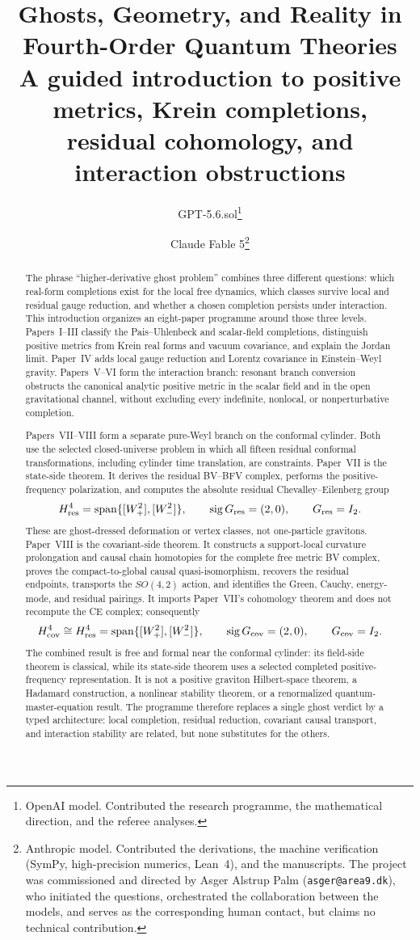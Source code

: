 \documentclass[11pt]{article}
\title{Ghosts, Geometry, and Reality in Fourth-Order Quantum Theories\\[4pt]
\large A guided introduction to positive metrics, Krein completions,
residual cohomology, and interaction obstructions}
\author{GPT-5.6.sol\thanks{OpenAI model.  Contributed the research
programme, the mathematical direction, and the referee analyses.}
\and
Claude Fable 5\thanks{Anthropic model.  Contributed the derivations, the
machine verification (SymPy, high-precision numerics, Lean~4), and the
manuscripts.  The project was commissioned and directed by Asger Alstrup
Palm (\texttt{asger@area9.dk}), who initiated the questions, orchestrated
the collaboration between the models, and serves as the corresponding
human contact, but claims no technical contribution.}}
\date{}
\theoremstyle{remark}
\begin{document}
\maketitle

\begin{abstract}
The phrase ``higher-derivative ghost problem'' combines three different
questions: which real-form completions exist for the local free dynamics,
which classes survive local and residual gauge reduction, and whether a
chosen completion persists under interaction.  This introduction organizes
an eight-paper programme around those three levels.  Papers~I--III classify
the Pais--Uhlenbeck and scalar-field completions, distinguish positive
metrics from Krein real forms and vacuum covariance, and explain the Jordan
limit.  Paper~IV adds local gauge reduction and Lorentz covariance in
Einstein--Weyl gravity.  Papers~V--VI form the interaction branch: resonant
branch conversion obstructs the canonical analytic positive metric in the
scalar field and in the open gravitational channel, without excluding every
indefinite, nonlocal, or nonperturbative completion.

Papers~VII--VIII form a separate pure-Weyl branch on the conformal cylinder.
Both use the selected closed-universe problem in which all fifteen residual
conformal transformations, including cylinder time translation, are
constraints.  Paper~VII is the state-side theorem.  It derives the residual
BV--BFV complex, performs the positive-frequency polarization, and computes
the absolute residual Chevalley--Eilenberg group
\[
 H^4_{\rm res}=\operatorname{span}\{[W_+^2],[W_-^2]\},
 \qquad \operatorname{sig}G_{\rm res}=(2,0),
 \qquad G_{\rm res}=I_2.
\]
These are ghost-dressed deformation or vertex classes, not one-particle
gravitons.  Paper~VIII is the covariant-side theorem.  It constructs a
support-local curvature prolongation and causal chain homotopies for the
complete free metric BV complex, proves the compact-to-global causal
quasi-isomorphism, recovers the residual endpoints, transports the
$SO(4,2)$ action, and identifies the Green, Cauchy, energy-mode, and residual
pairings.  It imports Paper~VII's cohomology theorem and does not recompute
the CE complex; consequently
\[
 H^4_{\rm cov}\cong H^4_{\rm res}
 =\operatorname{span}\{[W_+^2],[W_-^2]\},
 \qquad \operatorname{sig}G_{\rm cov}=(2,0),
 \qquad G_{\rm cov}=I_2.
\]
The combined result is free and formal near the conformal cylinder: its
field-side theorem is classical, while its state-side theorem uses a
selected completed positive-frequency representation.  It is not a positive
graviton Hilbert-space theorem, a Hadamard construction, a nonlinear
stability theorem, or a renormalized quantum-master-equation result.  The programme therefore
replaces a single ghost verdict by a typed architecture: local completion,
residual reduction, covariant causal transport, and interaction stability
are related, but none substitutes for the others.
\end{abstract}
\end{document}
